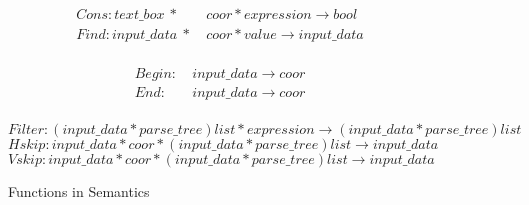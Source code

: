 \begin{figure*}[ht!]
\centering
\begin{minipage}{0.4\columnwidth}
\begin{align*}
  Cons:text\_box~*&~coor*expression \rightarrow bool \\
  Find:input\_data~*&~coor*value \rightarrow input\_data \\
\end{align*}
\end{minipage}
\hspace{10 mm}
\begin{minipage}{0.4\columnwidth}
\begin{align*}
  Begin:&~input\_data \rightarrow coor \\
  End:&~input\_data \rightarrow coor \\
\end{align*}
\end{minipage}
\vspace{-6 mm}
\[
  Filter:(input\_data*parse\_tree)list*expression \rightarrow (input\_data*parse\_tree)list 
\]
\[
  Hskip:input\_data*coor*(input\_data*parse\_tree)list \rightarrow input\_data 
\]
\[
  Vskip:input\_data*coor*(input\_data*parse\_tree)list \rightarrow input\_data 
\]
\caption{Functions in Semantics}\label{fig:funseman}
\end{figure*}

